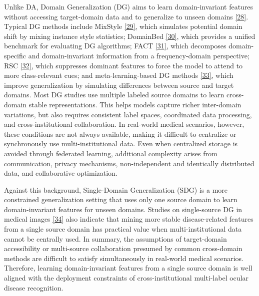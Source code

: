 Unlike DA, Domain Generalization (DG) aims to learn domain-invariant features without accessing target-domain data and to generalize to unseen domains \hyperref[_Ref213949554]{{[}28{]}}. Typical DG methods include MixStyle \hyperref[_Ref213949562]{{[}29{]}}, which simulates potential domain shift by mixing instance style statistics; DomainBed \hyperref[_Ref213949607]{{[}30{]}}, which provides a unified benchmark for evaluating DG algorithms; FACT \hyperref[_Ref213949788]{{[}31{]}}, which decomposes domain-specific and domain-invariant information from a frequency-domain perspective; RSC \hyperref[_Ref213949796]{{[}32{]}}, which suppresses dominant features to force the model to attend to more class-relevant cues; and meta-learning-based DG methods \hyperref[_Ref213949803]{{[}33{]}}, which improve generalization by simulating differences between source and target domains. Most DG studies use multiple labeled source domains to learn cross-domain stable representations. This helps models capture richer inter-domain variations, but also requires consistent label spaces, coordinated data processing, and cross-institutional collaboration. In real-world medical scenarios, however, these conditions are not always available, making it difficult to centralize or synchronously use multi-institutional data. Even when centralized storage is avoided through federated learning, additional complexity arises from communication, privacy mechanisms, non-independent and identically distributed data, and collaborative optimization.

Against this background, Single-Domain Generalization (SDG) is a more constrained generalization setting that uses only one source domain to learn domain-invariant features for unseen domains. Studies on single-source DG in medical images \hyperref[_Ref213949863]{{[}34{]}} also indicate that mining more stable disease-related features from a single source domain has practical value when multi-institutional data cannot be centrally used. In summary, the assumptions of target-domain accessibility or multi-source collaboration presumed by common cross-domain methods are difficult to satisfy simultaneously in real-world medical scenarios. Therefore, learning domain-invariant features from a single source domain is well aligned with the deployment constraints of cross-institutional multi-label ocular disease recognition.


